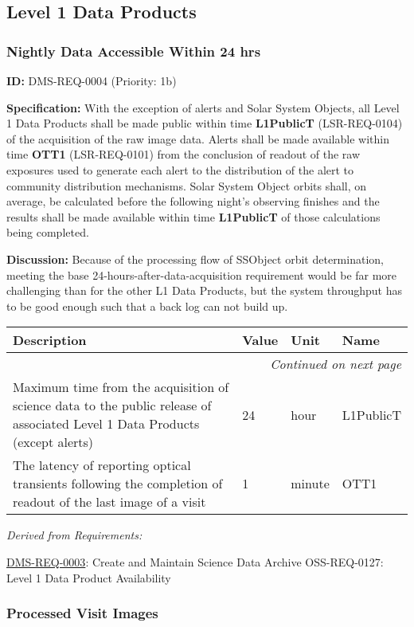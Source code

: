 \documentclass[SE,toc,lsstdraft]{lsstdoc}
\makeatletter
\newcommand{\paramname}[1]{\hspace{0pt}#1}
\newcommand{\unitname}[1]{\hspace{0pt}#1}
\newenvironment{parameters}[0]{%
\setlength\LTleft{0pt}
\setlength\LTright{\fill}
\begin{small}
\begin{longtable}[]{|p{0.49\textwidth}|l|p{0.6in}|p{1.70in}@{}|}

\hline \textbf{Description} & \textbf{Value} & \textbf{Unit} & \textbf{Name} \\ \hline
\endhead

\hline \multicolumn{4}{r}{\emph{Continued on next page}} \\
\endfoot

\hline\hline
\endlastfoot
}{%
\hline
\end{longtable}
\end{small}
}
\makeatother
\begin{document}
\subsection{Level 1 Data Products}

\subsubsection{Nightly Data Accessible Within 24 hrs}

\label{DMS-REQ-0004}
\textbf{ID:} DMS-REQ-0004 (Priority: 1b)

\textbf{Specification:} With the exception of alerts and Solar System Objects, all Level 1 Data Products shall be made public within time \textbf{L1PublicT} (LSR-REQ-0104) of the acquisition of the raw image data. Alerts shall be made available within time \textbf{OTT1} (LSR-REQ-0101) from the conclusion of readout of the raw exposures used to generate each alert to the distribution of the alert to community distribution mechanisms.  Solar System Object orbits shall, on average, be calculated before the following night's observing finishes and the results shall be made available within time \textbf{L1PublicT} of those calculations being completed.

\textbf{Discussion:} Because of the processing flow of SSObject orbit determination, meeting the base 24-hours-after-data-acquisition requirement would be far more challenging than for the other L1 Data Products, but the system throughput has to be good enough such that a back log can not build up.

\begin{parameters}
Maximum time from the acquisition of science data to the public release of associated Level 1 Data Products (except alerts)
&
24
&
\unitname{%
hour
}
&
\paramname{%
L1PublicT
} \\\hline
The latency of reporting optical transients following the completion of readout of the last image of a visit
&
1
&
\unitname{%
minute
}
&
\paramname{%
OTT1
} \\\hline
\end{parameters}

\emph{Derived from Requirements:}

\hyperref[DMS-REQ-0003]{DMS-REQ-0003}:
Create and Maintain Science Data Archive \newline
OSS-REQ-0127:
Level 1 Data Product Availability \newline

\subsubsection{Processed Visit Images}
\end{document}
